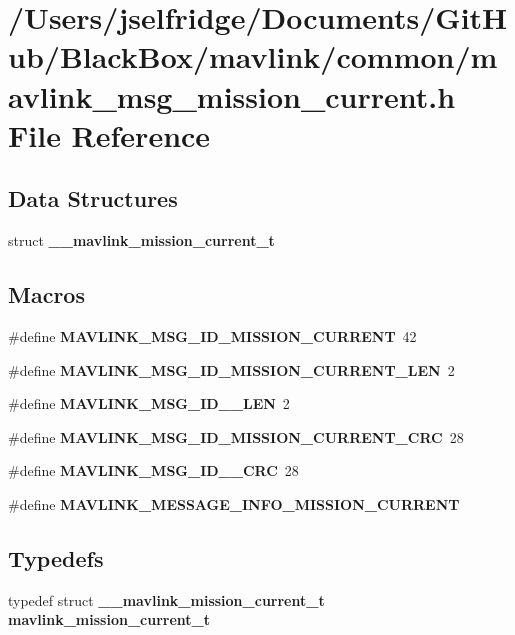 \section{/\+Users/jselfridge/\+Documents/\+Git\+Hub/\+Black\+Box/mavlink/common/mavlink\+\_\+msg\+\_\+mission\+\_\+current.h File Reference}
\label{mavlink__msg__mission__current_8h}
\subsection*{Data Structures}
\begin{DoxyCompactItemize}
\item 
struct \textbf{ \+\_\+\+\_\+mavlink\+\_\+mission\+\_\+current\+\_\+t}
\end{DoxyCompactItemize}
\subsection*{Macros}
\begin{DoxyCompactItemize}
\item 
\#define \textbf{ M\+A\+V\+L\+I\+N\+K\+\_\+\+M\+S\+G\+\_\+\+I\+D\+\_\+\+M\+I\+S\+S\+I\+O\+N\+\_\+\+C\+U\+R\+R\+E\+NT}~42
\item 
\#define \textbf{ M\+A\+V\+L\+I\+N\+K\+\_\+\+M\+S\+G\+\_\+\+I\+D\+\_\+\+M\+I\+S\+S\+I\+O\+N\+\_\+\+C\+U\+R\+R\+E\+N\+T\+\_\+\+L\+EN}~2
\item 
\#define \textbf{ M\+A\+V\+L\+I\+N\+K\+\_\+\+M\+S\+G\+\_\+\+I\+D\+\_\+\_\+\+L\+EN}~2
\item 
\#define \textbf{ M\+A\+V\+L\+I\+N\+K\+\_\+\+M\+S\+G\+\_\+\+I\+D\+\_\+\+M\+I\+S\+S\+I\+O\+N\+\_\+\+C\+U\+R\+R\+E\+N\+T\+\_\+\+C\+RC}~28
\item 
\#define \textbf{ M\+A\+V\+L\+I\+N\+K\+\_\+\+M\+S\+G\+\_\+\+I\+D\+\_\+\_\+\+C\+RC}~28
\item 
\#define \textbf{ M\+A\+V\+L\+I\+N\+K\+\_\+\+M\+E\+S\+S\+A\+G\+E\+\_\+\+I\+N\+F\+O\+\_\+\+M\+I\+S\+S\+I\+O\+N\+\_\+\+C\+U\+R\+R\+E\+NT}
\end{DoxyCompactItemize}
\subsection*{Typedefs}
\begin{DoxyCompactItemize}
\item 
typedef struct \textbf{ \+\_\+\+\_\+mavlink\+\_\+mission\+\_\+current\+\_\+t} \textbf{ mavlink\+\_\+mission\+\_\+current\+\_\+t}
\end{DoxyCompactItemize}


